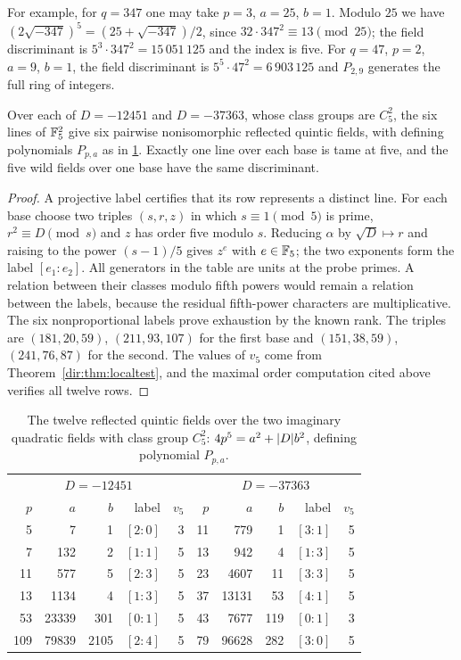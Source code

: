 For example, for $q=347$ one may take $p=3$, $a=25$, $b=1$. Modulo $25$ we have
$(2\sqrt{-347})^5=(25+\sqrt{-347})/2$, since $32\cdot347^2\equiv13\pmod{25}$; the field
discriminant is $5^3\cdot347^2=15\,051\,125$ and the index is five. For $q=47$, $p=2$,
$a=9$, $b=1$, the field discriminant is $5^5\cdot47^2=6\,903\,125$ and $P_{2,9}$
generates the full ring of integers.

\begin{proposition}\label{dir:prop:ranktwo}
Over each of $D=-12451$ and $D=-37363$, whose class groups are $C_5^2$, the six lines
of $\mathbb{F}_5^2$ give six pairwise nonisomorphic reflected quintic fields, with defining
polynomials $P_{p,a}$ as in \cref{dir:tab:ranktwo}. Exactly one line over each base is
tame at five, and the five wild fields over one base have the same discriminant.
\end{proposition}

\begin{proof}
A projective label certifies that its row represents a distinct line. For each base
choose two triples $(s,r,z)$ in which $s\equiv1\pmod5$ is prime, $r^2\equiv D\pmod s$
and $z$ has order five modulo $s$. Reducing $\alpha$ by $\sqrt D\mapsto r$ and raising
to the power $(s-1)/5$ gives $z^e$ with $e\in\mathbb{F}_5$; the two exponents form the label
$[e_1:e_2]$. All generators in the table are units at the probe primes. A relation
between their classes modulo fifth powers would remain a relation between the labels,
because the residual fifth-power characters are multiplicative. The six
nonproportional labels prove exhaustion by the known rank. The triples are
$(181,20,59)$, $(211,93,107)$ for the first base and $(151,38,59)$, $(241,76,87)$ for
the second. The values of $v_5$ come from Theorem~\ref{dir:thm:localtest}, and the maximal
order computation cited above verifies all twelve rows.
\end{proof}

\begin{table}[ht]
\centering\small
\begin{tabular}{rrrrr@{\qquad}rrrrr}
\toprule
\multicolumn{5}{c}{$D=-12451$} & \multicolumn{5}{c}{$D=-37363$}\\
$p$ & $a$ & $b$ & label & $v_5$ & $p$ & $a$ & $b$ & label & $v_5$\\
\midrule
5 & 7 & 1 & $[2\!:\!0]$ & 3 & 11 & 779 & 1 & $[3\!:\!1]$ & 5\\
7 & 132 & 2 & $[1\!:\!1]$ & 5 & 13 & 942 & 4 & $[1\!:\!3]$ & 5\\
11 & 577 & 5 & $[2\!:\!3]$ & 5 & 23 & 4607 & 11 & $[3\!:\!3]$ & 5\\
13 & 1134 & 4 & $[1\!:\!3]$ & 5 & 37 & 13131 & 53 & $[4\!:\!1]$ & 5\\
53 & 23339 & 301 & $[0\!:\!1]$ & 5 & 43 & 7677 & 119 & $[0\!:\!1]$ & 3\\
109 & 79839 & 2105 & $[2\!:\!4]$ & 5 & 79 & 96628 & 282 & $[3\!:\!0]$ & 5\\
\bottomrule
\end{tabular}
\caption{The twelve reflected quintic fields over the two imaginary quadratic fields
with class group $C_5^2$: $4p^5=a^2+\lvert D\rvert b^2$, defining polynomial $P_{p,a}$.}
\label{dir:tab:ranktwo}
\end{table}

